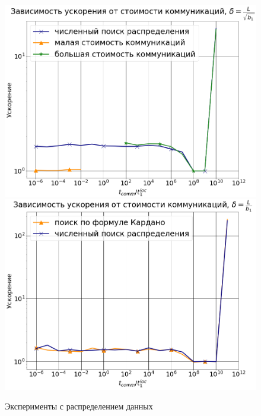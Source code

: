 \documentclass{article}
\theoremstyle{definition}
\theoremstyle{plain}
\begin{document}
\begin{figure}[!ht]
    {\includegraphics[scale = 0.24]{graph_rus11.png}}
    {\includegraphics[scale = 0.24]{graph_rus12.png}}
    \caption{Эксперименты с распределением данных}
    \label{ris:image}
\end{figure}



\end{document}
